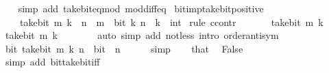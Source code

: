 \begin{isabellebody}
%
\isadelimproof
\ \ %
\endisadelimproof
%
\isatagproof
{}\isamarkupfalse%
\ {\isacharparenleft}{\kern0pt}simp\ add{\isacharcolon}{\kern0pt}\ take{\isacharunderscore}{\kern0pt}bit{\isacharunderscore}{\kern0pt}eq{\isacharunderscore}{\kern0pt}mod\ mod{\isacharunderscore}{\kern0pt}diff{\isacharunderscore}{\kern0pt}eq{\isacharparenright}{\kern0pt}%
\endisatagproof
{\isafoldproof}%
%
\isadelimproof
\isanewline
%
\endisadelimproof
\isanewline
{}\isamarkupfalse%
\ bit{\isacharunderscore}{\kern0pt}imp{\isacharunderscore}{\kern0pt}take{\isacharunderscore}{\kern0pt}bit{\isacharunderscore}{\kern0pt}positive{\isacharcolon}{\kern0pt}\isanewline
\ \ {\isacartoucheopen}{}\ {\isacharless}{\kern0pt}\ take{\isacharunderscore}{\kern0pt}bit\ m\ k{\isacartoucheclose}\ \ {\isacartoucheopen}n\ {\isacharless}{\kern0pt}\ m{\isacartoucheclose}\ \ {\isacartoucheopen}bit\ k\ n{\isacartoucheclose}\ \ k\ {\isacharcolon}{\kern0pt}{\isacharcolon}{\kern0pt}\ int\isanewline
%
\isadelimproof
%
\endisadelimproof
%
\isatagproof
{}\isamarkupfalse%
\ {\isacharparenleft}{\kern0pt}rule\ ccontr{\isacharparenright}{\kern0pt}\isanewline
\ \ \isamarkupfalse%
\ {\isacartoucheopen}{\isasymnot}\ {}\ {\isacharless}{\kern0pt}\ take{\isacharunderscore}{\kern0pt}bit\ m\ k{\isacartoucheclose}\isanewline
\ \ \isamarkupfalse%
\ \isamarkupfalse%
\ {\isacartoucheopen}take{\isacharunderscore}{\kern0pt}bit\ m\ k\ {\isacharequal}{\kern0pt}\ {}{\isacartoucheclose}\isanewline
\ \ \ \ \isamarkupfalse%
\ {\isacharparenleft}{\kern0pt}auto\ simp\ add{\isacharcolon}{\kern0pt}\ not{\isacharunderscore}{\kern0pt}less\ intro{\isacharcolon}{\kern0pt}\ order{\isacharunderscore}{\kern0pt}antisym{\isacharparenright}{\kern0pt}\isanewline
\ \ \isamarkupfalse%
\ \isamarkupfalse%
\ {\isacartoucheopen}bit\ {\isacharparenleft}{\kern0pt}take{\isacharunderscore}{\kern0pt}bit\ m\ k{\isacharparenright}{\kern0pt}\ n\ {\isacharequal}{\kern0pt}\ bit\ {}\ n{\isacartoucheclose}\isanewline
\ \ \ \ \isamarkupfalse%
\ simp\isanewline
\ \ \isamarkupfalse%
\ that\ \isamarkupfalse%
\ False\isanewline
\ \ \ \ \isamarkupfalse%
\ {\isacharparenleft}{\kern0pt}simp\ add{\isacharcolon}{\kern0pt}\ bit{\isacharunderscore}{\kern0pt}take{\isacharunderscore}{\kern0pt}bit{\isacharunderscore}{\kern0pt}iff{\isacharparenright}{\kern0pt}\isanewline
{}\isamarkupfalse%

\end{isabellebody}
